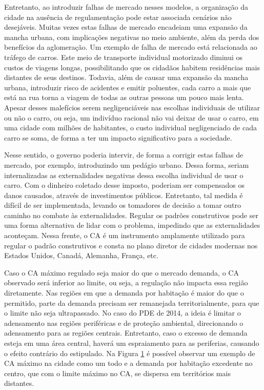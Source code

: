 Entretanto, ao introduzir falhas de mercado nesses modelos, a organização da cidade na ausência de regulamentação pode estar associada cenários não desejáveis. Muitas vezes estas falhas de mercado encadeiam uma expansão da mancha urbana, com implicações negativas no meio ambiente, além da perda dos benefícios da aglomeração. Um exemplo de falha de mercado está relacionada ao tráfego de carros. Este meio de transporte individual motorizado diminui os custos de viagens longas, possibilitando que os cidadãos habitem residências mais distantes de seus destinos. Todavia, além de causar uma expansão da mancha urbana, introduzir risco de acidentes e emitir poluentes, cada carro a mais que está na rua torna a viagem de todas as outras pessoas um pouco mais lenta. Apesar desses malefícios serem negligenciáveis nas escolhas individuais de utilizar ou não o carro, ou seja, um indivíduo racional não vai deixar de usar o carro, em uma cidade com milhões de habitantes, o custo individual negligenciado de cada carro se soma, de forma a ter um impacto significativo para a sociedade.

Nesse sentido, o governo poderia intervir, de forma a corrigir estas falhas de mercado, por exemplo, introduzindo um pedágio urbano. Dessa forma, seriam internalizadas as externalidades negativas dessa escolha individual de usar o carro. Com o dinheiro coletado desse imposto, poderiam ser compensados os danos causados, através de investimentos públicos. Entretanto, tal medida é difícil de ser implementada, levando os tomadores de decisão a tomar outro caminho no combate às externalidades. Regular os padrões construtivos pode ser uma forma alternativa de lidar com o problema, impedindo que as externalidades aconteçam. Nessa frente, o CA é um instrumento amplamente utilizado para regular o padrão construtivos e consta no plano diretor de cidades modernas nos Estados Unidos, Canadá, Alemanha, França, etc.

\begin{figure}[h]
    \caption{Impacto da regulação no CA da cidade}
    \centering
    \begin{subfigure}{.6\linewidth}
        
    \end{subfigure}
    \label{fig:FAR}
\end{figure}

Caso o CA máximo regulado seja maior do que o mercado demanda, o CA observado será inferior ao limite, ou seja, a regulação não impacta essa região diretamente. Nas regiões em que a demanda por habitação é maior do que o permitido, parte da demanda precisam ser remanejada territorialmente, para que o limite não seja ultrapassado. No caso do PDE de 2014, a ideia é limitar o adensamento nas regiões periféricas e de proteção ambiental, direcionando o adensamento para as regiões centrais. Entretanto, caso o excesso de demanda esteja em uma área central, haverá um espraiamento para as periferias, causando o efeito contrário do estipulado. Na Figura \ref{fig:FAR} é possível observar um exemplo de CA máximo na cidade como um todo e a demanda por habitação excedente no centro, que com o limite máximo no CA, se dispersa em territórios mais distantes.


